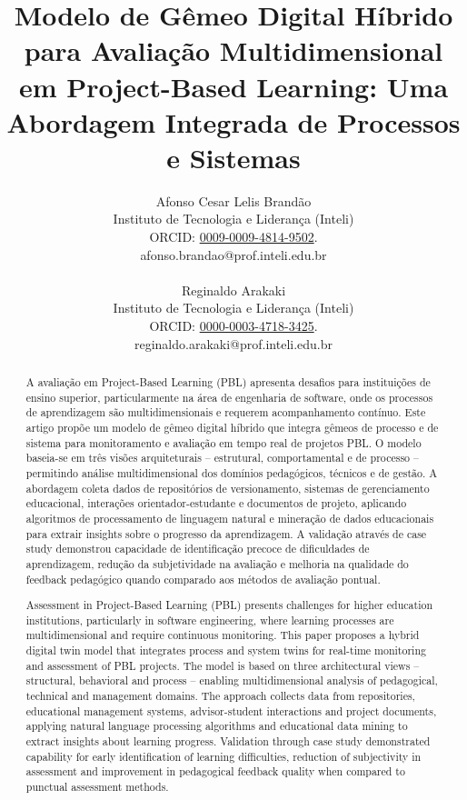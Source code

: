 \documentclass[english, spanish, brazilian]{modelo_dt}
\title{Modelo de Gêmeo Digital Híbrido para Avaliação Multidimensional em Project-Based Learning: Uma Abordagem Integrada de Processos e Sistemas}
\author{%
	Afonso Cesar Lelis Brandão\\
	Instituto de Tecnologia e Liderança (Inteli)\\
	ORCID: \href{https://orcid.org/0009-0009-4814-9502}{0009-0009-4814-9502}\@.\\
	afonso.brandao@prof.inteli.edu.br\\
	\\
	Reginaldo Arakaki\\
	Instituto de Tecnologia e Liderança (Inteli)\\
	ORCID: \href{https://orcid.org/0000-0003-4718-3425}{0000-0003-4718-3425}\@.\\
	reginaldo.arakaki@prof.inteli.edu.br
}
\begin{document}
\maketitle

\begin{otherlanguage}{brazilian}
\renewcommand{\abstractname}{Resumo}
\begin{abstract}
A avaliação em Project-Based Learning (PBL) apresenta desafios para instituições de ensino superior, particularmente na área de engenharia de software, onde os processos de aprendizagem são multidimensionais e requerem acompanhamento contínuo\@. Este artigo propõe um modelo de gêmeo digital híbrido que integra gêmeos de processo e de sistema para monitoramento e avaliação em tempo real de projetos PBL\@. O modelo baseia-se em três visões arquiteturais -- estrutural, comportamental e de processo -- permitindo análise multidimensional dos domínios pedagógicos, técnicos e de gestão\@. A abordagem coleta dados de repositórios de versionamento, sistemas de gerenciamento educacional, interações orientador-estudante e documentos de projeto, aplicando algoritmos de processamento de linguagem natural e mineração de dados educacionais para extrair insights sobre o progresso da aprendizagem\@. A validação através de case study demonstrou capacidade de identificação precoce de dificuldades de aprendizagem, redução da subjetividade na avaliação e melhoria na qualidade do feedback pedagógico quando comparado aos métodos de avaliação pontual\@.
\end{abstract}
\end{otherlanguage}

\begin{otherlanguage}{english}
\renewcommand{\abstractname}{Abstract}
\begin{abstract}
Assessment in Project-Based Learning (PBL) presents challenges for higher education institutions, particularly in software engineering, where learning processes are multidimensional and require continuous monitoring\@. This paper proposes a hybrid digital twin model that integrates process and system twins for real-time monitoring and assessment of PBL projects\@. The model is based on three architectural views -- structural, behavioral and process -- enabling multidimensional analysis of pedagogical, technical and management domains\@. The approach collects data from repositories, educational management systems, advisor-student interactions and project documents, applying natural language processing algorithms and educational data mining to extract insights about learning progress\@. Validation through case study demonstrated capability for early identification of learning difficulties, reduction of subjectivity in assessment and improvement in pedagogical feedback quality when compared to punctual assessment methods\@.
\end{abstract}
\end{otherlanguage}
\end{document}
